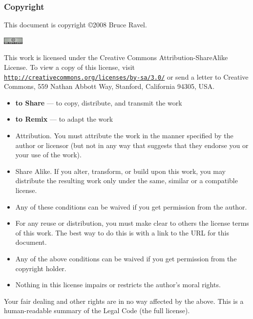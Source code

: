 
\begin{frame}
  \frametitle{Copyright}
  \tiny

  This document is copyright \copyright 2008 Bruce Ravel.

  \begin{center}
    \includegraphics[width=1.0cm]{images/somerights20}
  \end{center}

  This work is licensed under the Creative Commons
  Attribution-ShareAlike License.  To view a copy of this license,
  visit \href{http://creativecommons.org/licenses/by-sa/3.0/}
  {\color{Purple4}\texttt{http://creativecommons.org/licenses/by-sa/3.0/}}
  or send a letter to Creative Commons, 559 Nathan Abbott Way,
  Stanford, California 94305, USA.

  \begin{description}
  \item[You are free:] %
    \begin{itemize}
    \item \textbf{to Share} --- to copy, distribute, and transmit the work
    \item \textbf{to Remix} --- to adapt the work
    \end{itemize}
  \item[Under the following conditions:] %
    \begin{itemize}
    \item Attribution. You must attribute the work in the manner
      specified by the author or licensor (but not in any way that
      suggests that they endorse you or your use of the work).
    \item Share Alike. If you alter, transform, or build upon this
      work, you may distribute the resulting work only under the same,
      similar or a compatible license.
    \item Any of these conditions can be waived if you get permission
      from the author.
    \end{itemize}
  \end{description}
  \begin{itemize}
  \item For any reuse or distribution, you must make clear to others
    the license terms of this work. The best way to do this is with a
    link to the URL for this document.
  \item Any of the above conditions can be waived if you get
    permission from the copyright holder.
  \item Nothing in this license impairs or restricts the author's
    moral rights.
  \end{itemize}

  Your fair dealing and other rights are in no way affected by the
  above.  This is a human-readable summary of the Legal Code (the full
  license).


\end{frame}

